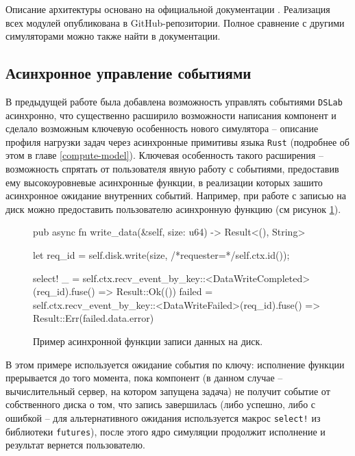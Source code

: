 Описание архитектуры основано на официальной документации \cite{dslab-architecture}. Реализация всех модулей опубликована в GitHub-репозитории\cite{dslab-repo}. Полное сравнение с другими симуляторами можно также найти в документации\cite{dslab-analog-cmp}.

\subsection{Асинхронное управление событиями}

В предыдущей работе была добавлена возможность управлять событиями \texttt{DSLab} асинхронно\cite{async-dslab}, что существенно расширило возможности написания компонент и сделало возможным ключевую особенность нового симулятора -- описание профиля нагрузки задач через асинхронные примитивы языка \texttt{Rust} (подробнее об этом в главе \ref{compute-model}). Ключевая особенность такого расширения -- возможность спрятать от пользователя явную работу с событиями, предоставив ему высокоуровневые асинхронные функции, в реализации которых зашито асинхронное ожидание внутренних событий. Например, при работе с записью на диск можно предоставить пользователю асинхронную функцию (см рисунок \ref{fig:async-write}). 
\begin{figure}[h]
    \footnotesize
    \begin{rustcode}
pub async fn write_data(&self, size: u64) -> Result<(), String> {
  let req_id = self.disk.write(size, /*requester=*/self.ctx.id());

  select! {
    _ = self.ctx.recv_event_by_key::<DataWriteCompleted>(req_id).fuse() => {
        Result::Ok(())
    }
    failed = self.ctx.recv_event_by_key::<DataWriteFailed>(req_id).fuse() => {
        Result::Err(failed.data.error)
    }
  }
}
    \end{rustcode}
    \caption{Пример асинхронной функции записи данных на диск.}
    \label{fig:async-write}
\end{figure}

В этом примере используется ожидание события по ключу: исполнение функции прерывается до того момента, пока компонент (в данном случае -- вычислительный сервер, на котором запущена задача) не получит событие от собственного диска о том, что запись завершилась (либо успешно, либо с ошибкой -- для альтернативного ожидания используется макрос \texttt{select!} из библиотеки \texttt{futures}\cite{rust-futures}), после этого ядро симуляции продолжит исполнение и результат вернется пользователю.  

